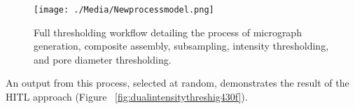\documentclass[review]{elsarticle}
\begin{document}


\begin{figure}[!htbp]
    \centering
    \texttt{[image: ./Media/Newprocessmodel.png]}
    \caption{Full thresholding workflow detailing the process of micrograph generation,
     composite assembly, subsampling, intensity thresholding, and pore diameter thresholding.}
    \label{fig:Final Workflow}
\end{figure}

An output from this process, selected at random, demonstrates the result of the
HITL approach (Figure ~\ref{fig:dualintensitythreshig430f}).

\begin{figure}[!htbp]
    \centering

\end{figure}
\end{document}
